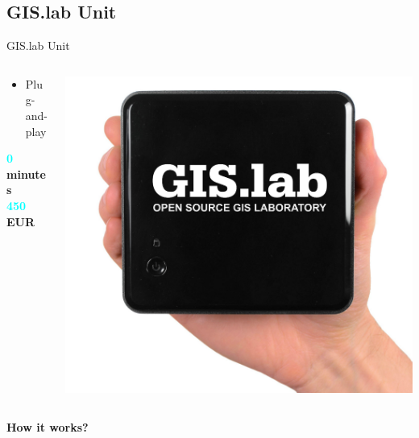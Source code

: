 \documentclass[12pt]{beamer}
\begin{document}
\subsection{GIS.lab Unit}
\begin{frame}{GIS.lab Unit}
	\begin{minipage}[\textheight]{\textwidth}
	\begin{columns}[T]
		\begin{column}{0.5\textwidth}
			\vspace{0.3\textheight}
			\begin{itemize}
				\item Plug-and-play
			\end{itemize}
			\begin{flushleft}
				\textbf{\textcolor{Cyan}{0} minutes} \\
				\textbf{\textcolor{Cyan}{450} EUR} \\
			\end{flushleft}
		\end{column}
		\begin{column}{0.5\textwidth}
			\includegraphics[keepaspectratio=true,width=\textwidth]{images/gislab-unit.png}
		\end{column}
	\end{columns}
	\end{minipage}
\end{frame}


\begin{frame}
	\LARGE \textbf{How it works?}
\end{frame}
\end{document}
